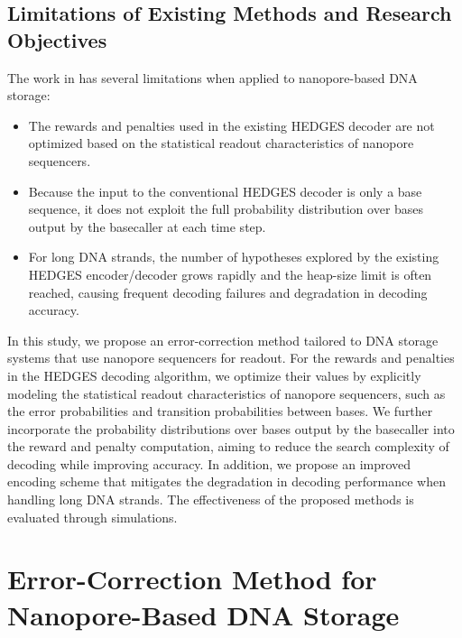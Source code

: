 \documentclass[sotsuron]{kuee}
\begin{document}
\subsection{Limitations of Existing Methods and Research Objectives} \label{sec:problem}
The work in\cite{HEDGES} has several limitations when applied to nanopore-based DNA storage:
\begin{itemize}
  \item The rewards and penalties used in the existing HEDGES decoder are not optimized based on the
  statistical readout characteristics of nanopore sequencers.
  \item Because the input to the conventional HEDGES decoder is only a base sequence, it does not exploit
  the full probability distribution over bases output by the basecaller at each time step.
  \item For long DNA strands, the number of hypotheses explored by the existing HEDGES encoder/decoder
  grows rapidly and the heap-size limit is often reached, causing frequent decoding failures and
  degradation in decoding accuracy.
\end{itemize}
In this study, we propose an error-correction method tailored to DNA storage systems that use nanopore
sequencers for readout.
For the rewards and penalties in the HEDGES decoding algorithm, we optimize their values by explicitly
modeling the statistical readout characteristics of nanopore sequencers, such as the error probabilities
and transition probabilities between bases.
We further incorporate the probability distributions over bases output by the basecaller into the reward
and penalty computation, aiming to reduce the search complexity of decoding while improving accuracy.
In addition, we propose an improved encoding scheme that mitigates the degradation in decoding performance
when handling long DNA strands.
The effectiveness of the proposed methods is evaluated through simulations.

\section{Error-Correction Method for Nanopore-Based DNA Storage}\label{proposed_method}
\end{document}
